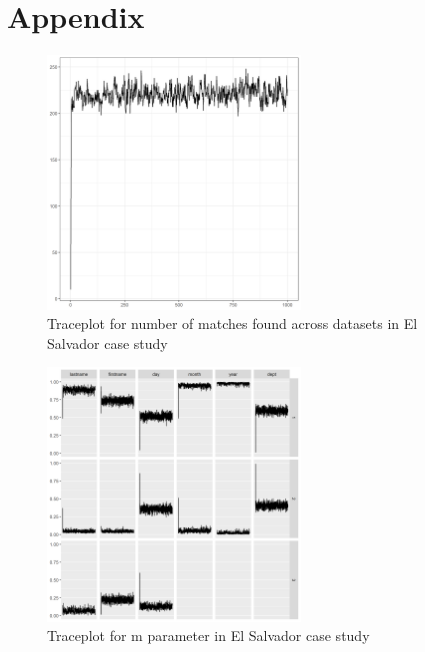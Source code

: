 \documentclass[12pt,letterpaper]{article}
\newcommand{\1}[1]{\mathbb{I}\!\left[#1\right]} %
\begin{document}
\clearpage

\section{Appendix}
\label{sec:appendix}

\begin{figure}[h]
\begin{center}
\includegraphics[width=0.6\textwidth]{../notes/figures/el_salvador/overlap_trace} 
\caption{Traceplot for number of matches found across datasets in El Salvador case study}\label{fig:overlap_trace}
\end{center}
\end{figure}



\begin{figure}[h]
\begin{center}
\includegraphics[width=0.6\textwidth]{../notes/figures/el_salvador/m_trace} 
\caption{Traceplot for m parameter in El Salvador case study}\label{fig:m_trace}
\end{center}
\end{figure}
\end{document}
